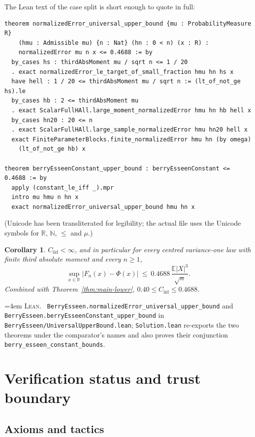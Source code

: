 \documentclass[10pt,a4paper]{article}
\theoremstyle{plain}
\newtheorem{corollary}[theorem]{Corollary}
\theoremstyle{definition}
\newcommand{\R}{\mathbb{R}}
\newcommand{\N}{\mathbb{N}}
\newcommand{\E}{\mathbb{E}}
\newcommand{\Cii}{C_{\mathrm{iid}}}
\newcommand{\lean}[1]{\texttt{#1}}
\newcommand{\file}[1]{\texttt{#1}}
\newenvironment{leanref}%
  {\par\addvspace{3pt}\begingroup\sloppy\emergencystretch=4em
   \noindent\footnotesize\textsc{Lean.}\ \ignorespaces}%
  {\par\endgroup\addvspace{3pt}}
\begin{document}
The Lean text of the case split is short enough to quote in full:
\begin{verbatim}
theorem normalizedError_universal_upper_bound {mu : ProbabilityMeasure R}
    (hmu : Admissible mu) {n : Nat} (hn : 0 < n) (x : R) :
    normalizedError mu n x <= 0.4688 := by
  by_cases hs : thirdAbsMoment mu / sqrt n <= 1 / 20
  . exact normalizedError_le_target_of_small_fraction hmu hn hs x
  have hell : 1 / 20 <= thirdAbsMoment mu / sqrt n := (lt_of_not_ge hs).le
  by_cases hb : 2 <= thirdAbsMoment mu
  . exact ScalarFullHAll.large_moment_normalizedError hmu hn hb hell x
  by_cases hn20 : 20 <= n
  . exact ScalarFullHAll.large_sample_normalizedError hmu hn20 hell x
  exact FiniteParameterBlocks.finite_normalizedError hmu hn (by omega)
    (lt_of_not_ge hb) x

theorem berryEsseenConstant_upper_bound : berryEsseenConstant <= 0.4688 := by
  apply (constant_le_iff _).mpr
  intro mu hmu n hn x
  exact normalizedError_universal_upper_bound hmu hn x
\end{verbatim}
(Unicode has been transliterated for legibility; the actual file uses
the Unicode symbols for $\R$, $\N$, $\le$ and $\mu$.)

\begin{corollary}
$\Cii<\infty$, and in particular for every centred variance-one law with finite
third absolute moment and every $n\ge1$,
\[
  \sup_{x\in\R}\bigl|F_n(x)-\Phi(x)\bigr| \ \le\ 0.4688\,\frac{\E|X|^3}{\sqrt n}.
\]
Combined with Theorem~\ref{thm:main-lower}, $0.40\le\Cii\le0.4688$.
\end{corollary}

\begin{leanref}
\lean{BerryEsseen.normalizedError\_universal\_upper\_bound} and
\lean{BerryEsseen.berryEsseenConstant\_upper\_bound} in
\file{BerryEsseen/UniversalUpperBound.lean}; \file{Solution.lean} re-exports the
two theorems under the comparator's names and also proves their conjunction
\lean{berry\_esseen\_constant\_bounds}.
\end{leanref}

\section{Verification status and trust boundary}
\label{sec:verification}

\subsection{Axioms and tactics}
\end{document}
